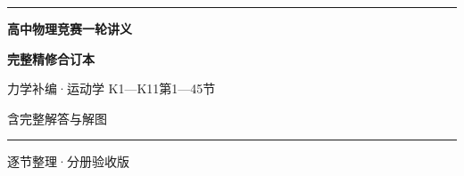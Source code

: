 \documentclass[UTF8,zihao=-4,openany]{ctexbook}
\begin{document}
\begin{titlepage}
  \centering
  \vspace*{42mm}
  {\color{accent}\rule{0.72\textwidth}{1.1pt}\par}
  \vspace{14mm}
  {\bfseries 高中物理竞赛一轮讲义\par}
  \vspace{10mm}
  {\bfseries 完整精修合订本\par}
  \vspace{9mm}
  {力学补编·运动学 K1—K11\quad 第1—45节\par}
  \vspace{8mm}
  {含完整解答与解图\par}
  \vspace{14mm}
  {\color{accent}\rule{0.72\textwidth}{1.1pt}\par}
  \vfill
  {逐节整理·分册验收版\par}
  \vspace{14mm}
\end{titlepage}

\tableofcontents
\end{document}
